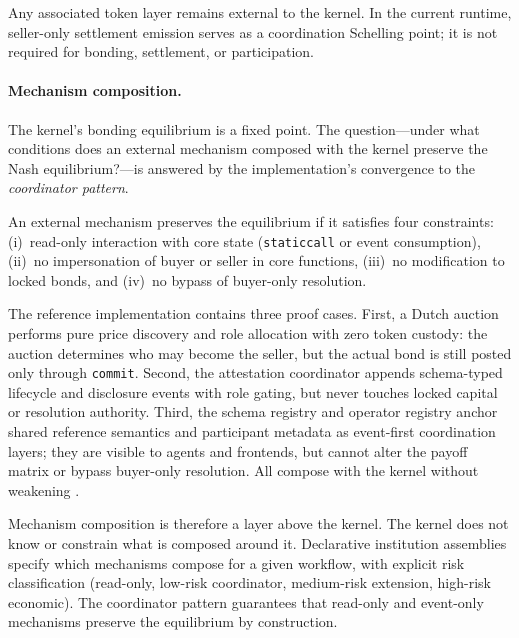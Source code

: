 \documentclass[11pt,a4paper]{article}
\theoremstyle{definition}
\theoremstyle{remark}
\begin{document}
Any associated token layer remains external to the kernel. In the
current runtime, seller-only settlement emission serves as a
coordination Schelling point; it is not required for bonding,
settlement, or participation.

\paragraph{Mechanism composition.}
The kernel's bonding equilibrium is a fixed point. The question---under
what conditions does an external mechanism composed with the kernel
preserve the Nash equilibrium?---is answered by the implementation's
convergence to the \emph{coordinator pattern}.

An external mechanism preserves the equilibrium if it satisfies four
constraints: (i)~read-only interaction with core state
(\texttt{staticcall} or event consumption), (ii)~no impersonation of
buyer or seller in core functions, (iii)~no modification to locked
bonds, and (iv)~no bypass of buyer-only resolution.

The reference implementation contains three proof cases. First, a Dutch
auction performs pure price discovery and role allocation with zero
token custody: the auction determines who may become the seller, but the
actual bond is still posted only through \texttt{commit}. Second, the
attestation coordinator appends schema-typed lifecycle and disclosure
events with role gating, but never touches locked capital or resolution
authority. Third, the schema registry and operator registry anchor
shared reference semantics and participant metadata as event-first
coordination layers; they are visible to agents and frontends, but
cannot alter the payoff matrix or bypass buyer-only resolution. All
compose with the kernel without weakening .

Mechanism composition is therefore a layer above the kernel. The kernel
does not know or constrain what is composed around it. Declarative
institution assemblies specify which mechanisms compose for a given
workflow, with explicit risk classification (read-only, low-risk
coordinator, medium-risk extension, high-risk economic). The
coordinator pattern guarantees that read-only and event-only mechanisms
preserve the equilibrium by construction.
\end{document}
